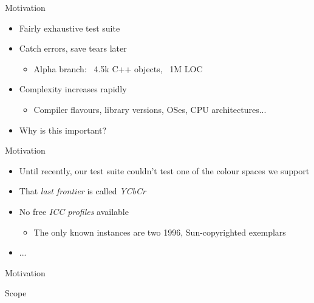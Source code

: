 \documentclass[final, aspectratio=169]{divoc}
\begin{document}
\begin{frame}{Motivation}
  \begin{itemize}
    \item Fairly exhaustive test suite
    \item Catch errors, save tears later
          \begin{itemize}
            \item Alpha branch: ~4.5k C++ objects, ~1M LOC
          \end{itemize}
    \item Complexity increases rapidly
          \begin{itemize}
            \item Compiler flavours, library versions, OSes, CPU architectures...
          \end{itemize}
    \item Why is this important?
  \end{itemize}
\end{frame}
\begin{frame}{Motivation}
  \begin{itemize}
    \item Until recently, our test suite couldn't test one of the colour spaces we support
    \item That \emph{last frontier} is called \emph{YCbCr}
    \item No free \emph{ICC profiles} available
          \begin{itemize}
            \item The only known instances are two 1996, Sun-copyrighted exemplars
          \end{itemize}
    \item ...
  \end{itemize}
\end{frame}
\begin{frame}{Motivation}
  \begin{center}
    \Large
  \end{center}
\end{frame}
\begin{frame}{Scope}
  \tableofcontents
\end{frame}
\end{document}

